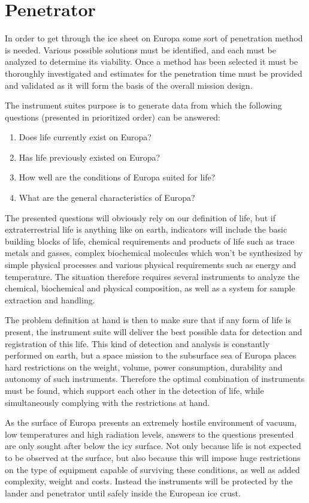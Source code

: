 \section{Penetrator}
In order to get through the ice sheet on Europa some sort of penetration method is needed. Various possible solutions must be identified, and each must be analyzed to determine its viability. Once a method has been selected it must be thoroughly investigated and estimates for the penetration time must be provided and validated as it will form the basis of the overall mission design.

The instrument suites purpose is to generate data from which the following questions (presented in prioritized order) can be answered:
\begin{enumerate}
    \item Does life currently exist on Europa?
    \item Has life previously existed on Europa?
    \item How well are the conditions of Europa suited for life?
    \item What are the general characteristics of Europa?
\end{enumerate}

The presented questions will obviously rely on our definition of life, but if extraterrestrial life is anything like on earth, indicators will include the basic building blocks of life, chemical requirements and products of life such as trace metals and gasses, complex biochemical molecules which won’t be synthesized by simple physical processes and various physical requirements such as energy and temperature. The situation therefore requires several instruments to analyze the chemical, biochemical and physical composition, as well as a system for sample extraction and handling.

The problem definition at hand is then to make sure that if any form of life is present, the instrument suite will deliver the best possible data for detection and registration of this life. This kind of detection and analysis is constantly performed on earth, but a space mission to the subsurface sea of Europa places hard restrictions on the weight, volume, power consumption, durability and autonomy of such instruments. Therefore the optimal combination of instruments must be found, which support each other in the detection of life, while simultaneously complying with the restrictions at hand. 

As the surface of Europa presents an extremely hostile environment of vacuum, low temperatures and high radiation levels, answers to the questions presented are only sought after below the icy surface. Not only because life is not expected to be observed at the surface, but also because this will impose huge restrictions on the type of equipment capable of surviving these conditions, as well as added complexity, weight and costs. Instead the instruments will be protected by the lander and penetrator until safely inside the European ice crust.

